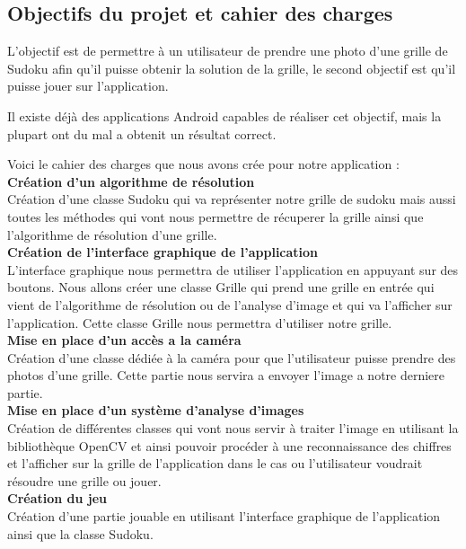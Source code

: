 \documentclass{article}
\begin{document}
\subsection{Objectifs du projet et cahier des charges}
L’objectif est de permettre à un utilisateur de prendre une photo d'une grille de Sudoku afin qu'il puisse 
obtenir la solution de la grille, le second objectif est qu'il puisse jouer sur l'application.

Il existe déjà des applications Android capables de réaliser cet objectif, mais la plupart ont du mal a obtenit un résultat correct.


Voici le cahier des charges que nous avons crée pour notre application :\\

\textbf{ Création d'un algorithme de résolution}\\
Création d'une classe Sudoku qui va représenter notre grille de sudoku mais aussi toutes les méthodes qui vont nous permettre de récuperer la grille ainsi que l'algorithme de résolution d'une grille.\\

\textbf{Création de l'interface graphique de l'application}\\
L'interface graphique nous permettra de utiliser l'application en appuyant sur des boutons.
Nous allons créer une classe Grille qui prend une grille en entrée qui vient de l'algorithme de résolution ou de l'analyse d'image et qui va l'afficher sur l'application. Cette classe Grille nous permettra d'utiliser notre grille.
\\

\textbf{Mise en place d'un accès a la caméra}\\
Création d'une classe dédiée à la caméra pour que l'utilisateur puisse prendre des photos d'une grille.
Cette partie nous servira a envoyer l'image a notre derniere partie.\\

\textbf{Mise en place d'un système d'analyse d'images}\\
Création de différentes classes qui vont nous servir à traiter l'image en utilisant la bibliothèque OpenCV
et ainsi pouvoir procéder à une reconnaissance des chiffres et l'afficher sur la grille de l'application dans le cas ou l'utilisateur voudrait résoudre une grille ou jouer.\\

\textbf{Création du jeu}\\
Création d'une partie jouable en utilisant l'interface graphique de l'application ainsi que la classe Sudoku.\\
\end{document}

